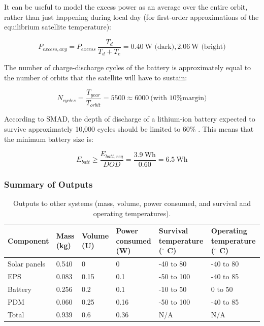 \documentclass[12pt]{article}
\begin{document}
It can be useful to model the excess power as an average over the entire orbit, rather than just happening during local day (for first-order approximations of the equilibrium satellite temperature):

\begin{equation}
P_{excess,avg} = P_{excess} \: \frac{T_d}{T_d + T_e} = 0.40 \ \text{W (dark)}, 2.06 \ \text{W (bright)}
\label{eq:power-excess-avg}
\end{equation}

The number of charge-discharge cycles of the battery is approximately equal to the number of orbits that the satellite will have to sustain:

\begin{equation}
N_{cycles} = \frac{T_{year}}{T_{orbit}} = 5500 \approx 6000 \ \text{(with 10\% margin)}
\label{eq:power-num-cycles}
\end{equation}

According to SMAD, the depth of discharge of a lithium-ion battery expected to survive approximately 10,000 cycles should be limited to 60\% \cite[p.~651,~Fig.~21-16]{SMAD}.  This means that the minimum battery size is:

\begin{equation}
E_{batt} \geq \frac{E_{batt,req}}{DOD} = \frac{3.9 \ \text{Wh}}{0.60} = 6.5 \ \text{Wh}
\label{eq:power-batt-size}
\end{equation}

			\subsubsection{Summary of Outputs}
			
			

\begin{table}[ht]
\caption{Outputs to other systems (mass, volume, power consumed, and survival and operating temperatures).\cite[p.~9]{EPS-manual}\cite[p.~11,~21]{PDM-manual}\cite[p.~9]{Battery-manual}\cite[p.~2]{Solar-panel-datasheet}}
\label{tab:power-outputs}
\begin{center}
    \begin{tabular}{|l|l|l|p{0.8in}|p{1in}|p{1.1in}|} \hline
\textbf{Component} & \textbf{Mass (kg)} & \textbf{Volume (U)} & \textbf{Power consumed (W)} & \textbf{Survival temperature ($^\circ$ C)} & \textbf{Operating temperature ($^\circ$ C)} \\ \hline \hline
Solar panels & 0.540 & 0 & 0 & -40 to 80 & -40 to 80 \\\hline
EPS & 0.083 & 0.15 & 0.1 & -50 to 100 & -40 to 85 \\\hline
Battery & 0.256 & 0.2 & 0.1 & -10 to 50 & 0 to 50 \\\hline
PDM & 0.060 & 0.25 & 0.16 & -50 to 100 & -40 to 85 \\\hline \hline
Total & 0.939 & 0.6 & 0.36 & N/A & N/A \\\hline
    \end{tabular}
\end{center}
\end{table}
\end{document}
